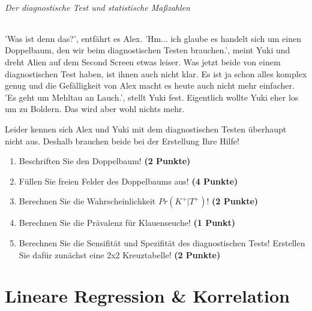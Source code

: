 \documentclass[a4paper, 9pt]{scrartcl}\usepackage[]{graphicx}\usepackage[]{xcolor}
\begin{document}
\paragraph{Der diagnostische Test und statistische Maßzahlen}

'Was ist denn das?', entfährt es Alex. 'Hm... ich glaube es handelt sich um einen Doppelbaum, den wir beim diagnostischen Testen brauchen.', meint Yuki und dreht Alien auf dem Second Screen etwas leiser. Was jetzt beide von einem diagnostischen Test haben, ist ihnen auch nicht klar. Es ist ja schon alles komplex genug und die Gefälligkeit von Alex macht es heute auch nicht mehr einfacher. 'Es geht um Mehltau an Lauch.', stellt Yuki fest. Eigentlich wollte Yuki eher los um zu Boldern. Das wird aber wohl nichts mehr.


Leider kennen sich Alex und Yuki mit dem diagnostischen Testen überhaupt nicht aus. Deshalb brauchen beide bei der Erstellung Ihre Hilfe! 
  
\begin{enumerate}
\item Beschriften Sie den Doppelbaum! \textbf{(2 Punkte)}
\item Füllen Sie freien Felder des Doppelbaums aus! \textbf{(4 Punkte)}
\item Berechnen Sie die Wahrscheinlichkeit $Pr(K^+|T^+)$! \textbf{(2 Punkte)}
\item Berechnen Sie die Prävalenz für Klauenseuche! \textbf{(1 Punkt)}
\item Berechnen Sie die Sensifität und Spezifität des diagnostischen Tests! Erstellen Sie dafür zunächst eine 2x2 Kreuztabelle! \textbf{(2 Punkte)}
\end{enumerate}

 





 
\clearpage
\part{Lineare Regression \& Korrelation}
\end{document}
